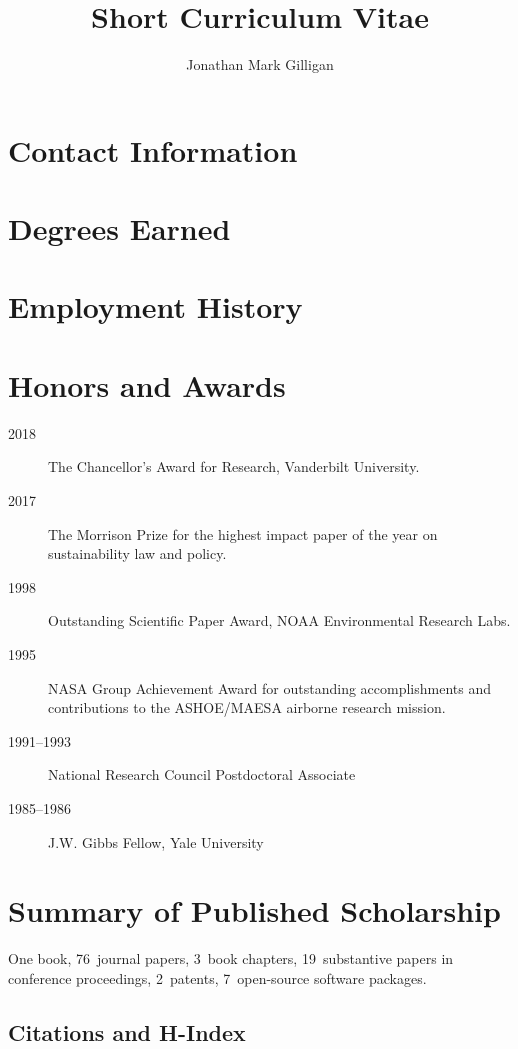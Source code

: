 \documentclass[10pt]{article}
\title{Short Curriculum Vitae}
\date{\thedate}
\author{Jonathan Mark Gilligan}
\begin{document}
\maketitle

\section{Contact Information}


\section{Degrees Earned}
\begin{description}
	
\end{description}
\section{Employment History}


\section{Honors and Awards}
\begin{description}
\item[2018] The Chancellor's Award for Research, Vanderbilt University.
\item[2017] The Morrison Prize for the highest impact paper of the year
  on sustainability law and policy.
\item[1998] Outstanding Scientific Paper Award, NOAA Environmental Research
  Labs.
\item[1995] NASA Group Achievement Award for outstanding accomplishments and
  contributions to the ASHOE/MAESA airborne research mission.
\item[1991--1993] National Research Council Postdoctoral Associate
\item[1985--1986] J.W. Gibbs Fellow, Yale University
\end{description}

\section{Summary of Published Scholarship}
    One book, 76~journal papers, 3~book chapters, 19~substantive papers in
    conference proceedings, 2~patents, 7~open-source software packages.
    \subsection{Citations and H-Index}
    
\end{document}
